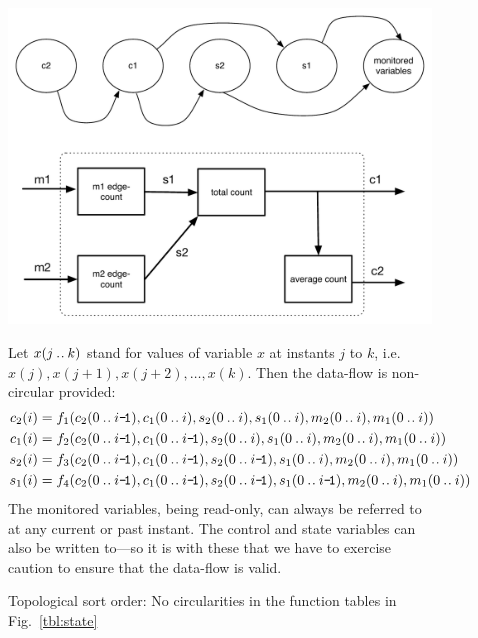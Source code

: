 \begin{figure}[!t]
\begin{mdframed}
\begin{center}
\includegraphics[width=.9\textwidth]{pics/topological.pdf}
\end{center}

Let $x(j\mathbin{.\mkern1mu.} k)$ stand for values of variable $x$ at instants $j$ to $k$, i.e.\\
$x(j), x(j+1), x(j+2),\ldots,x(k)$. Then the data-flow is non-circular provided:
\small
\begin{align}
c_2(i) &= f_1(c_2(0 \upto \im{1}), c_1(0\upto i), s_2(0\upto i), s_1(0\upto i), m_2(0\upto i), m_1(0\upto i))\\\label{eqn:coherent}
c_1(i) &= f_2(c_2(0\upto \im{1}), c_1(0\upto \im{1}), s_2(0\upto i), s_1(0\upto i), m_2(0\upto i), m_1(0\upto i))\\
s_2(i) &= f_3(c_2(0\upto \im{1}), c_1(0\upto \im{1}), s_2(0\upto \im{1}), s_1(0\upto i), m_2(0\upto i), m_1(0\upto i))\\
s_1(i) &= f_4(c_2(0\upto \im{1}), c_1(0\upto \im{1}), s_2(0\upto \im{1}), s_1(0\upto \im{1}), m_2(0\upto i), m_1(0\upto i))
\end{align}
\normalsize
The monitored variables, being read-only, can always be referred to at any current or past instant. The control and state variables can also be written to---so it is with these that we have to exercise caution to ensure that the data-flow is valid.
\end{mdframed}
\caption{Topological sort order: No circularities in the function tables in Fig.~\ref{tbl:state}}
\label{fig:topological}
\end{figure}

